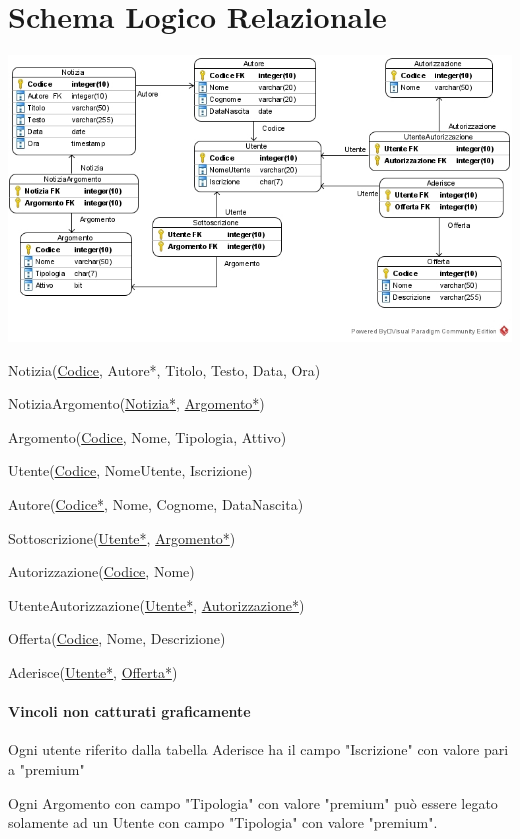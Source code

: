 \documentclass[10pt]{article}
\begin{document}
\section{Schema Logico Relazionale}
\begin{center}
	\includegraphics[scale=0.75]{LogicoRelazionale.jpg}
\end{center}
\begin{list}{}{\textbf{Notazione testuale}}
	\item Notizia(\underline{Codice}, Autore*, Titolo, Testo, Data, Ora)
	\item NotiziaArgomento(\underline{Notizia*}, \underline{Argomento*})
	\item Argomento(\underline{Codice}, Nome, Tipologia, Attivo)
	\item Utente(\underline{Codice}, NomeUtente, Iscrizione)
	\item Autore(\underline{Codice*}, Nome, Cognome, DataNascita)
	\item Sottoscrizione(\underline{Utente*}, \underline{Argomento*})
	\item Autorizzazione(\underline{Codice}, Nome)
	\item UtenteAutorizzazione(\underline{Utente*}, \underline{Autorizzazione*})
	\item Offerta(\underline{Codice}, Nome, Descrizione)
	\item Aderisce(\underline{Utente*}, \underline{Offerta*})
\end{list}
\paragraph{Vincoli non catturati graficamente}
\begin{list}{}{}
	\item Ogni utente riferito dalla tabella Aderisce ha il campo "Iscrizione" con valore pari a "premium"
	\item Ogni Argomento con campo "Tipologia" con valore "premium" può essere legato solamente ad un Utente con campo "Tipologia" con valore "premium".
\end{list}
\pagebreak
\end{document}
